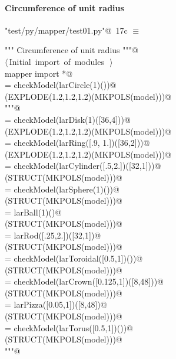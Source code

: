 \documentclass[11pt,oneside]{article}	%
\begin{document}
\paragraph{Circumference of unit radius}

\begin{flushleft} \small \label{scrap37}
\protect{}\verb@"test/py/mapper/test01.py"@\nobreak\ {\footnotesize 17c }$\equiv$
\vspace{-1ex}
\begin{list}{}{} \item
\mbox{}\verb@""" Circumference of unit radius """@\\
\mbox{}\verb@@\hbox{$\langle\,$Initial import of modules\nobreak\ {\footnotesize {}}$\,\rangle$}\verb@@\\
\mbox{}\verb@from mapper import *@\\
\mbox{}\verb@model = checkModel(larCircle(1)())@\\
\mbox{}\verb@VIEW(EXPLODE(1.2,1.2,1.2)(MKPOLS(model)))@\\
\mbox{}\verb@"""@\\
\mbox{}\verb@model = checkModel(larDisk(1)([36,4]))@\\
\mbox{}\verb@VIEW(EXPLODE(1.2,1.2,1.2)(MKPOLS(model)))@\\
\mbox{}\verb@model = checkModel(larRing([.9, 1.])([36,2]))@\\
\mbox{}\verb@VIEW(EXPLODE(1.2,1.2,1.2)(MKPOLS(model)))@\\
\mbox{}\verb@model = checkModel(larCylinder([.5,2.])([32,1]))@\\
\mbox{}\verb@VIEW(STRUCT(MKPOLS(model)))@\\
\mbox{}\verb@model = checkModel(larSphere(1)())@\\
\mbox{}\verb@VIEW(STRUCT(MKPOLS(model)))@\\
\mbox{}\verb@model = larBall(1)()@\\
\mbox{}\verb@VIEW(STRUCT(MKPOLS(model)))@\\
\mbox{}\verb@model = larRod([.25,2.])([32,1])@\\
\mbox{}\verb@VIEW(STRUCT(MKPOLS(model)))@\\
\mbox{}\verb@model = checkModel(larToroidal([0.5,1])())@\\
\mbox{}\verb@VIEW(STRUCT(MKPOLS(model)))@\\
\mbox{}\verb@model = checkModel(larCrown([0.125,1])([8,48]))@\\
\mbox{}\verb@VIEW(STRUCT(MKPOLS(model)))@\\
\mbox{}\verb@model = larPizza([0.05,1])([8,48])@\\
\mbox{}\verb@VIEW(STRUCT(MKPOLS(model)))@\\
\mbox{}\verb@model = checkModel(larTorus([0.5,1])())@\\
\mbox{}\verb@VIEW(STRUCT(MKPOLS(model)))@\\
\mbox{}\verb@"""@\\
\mbox{}\verb@@{\NWsep}
\end{list}
\vspace{-2ex}
\end{flushleft}
\end{document}
